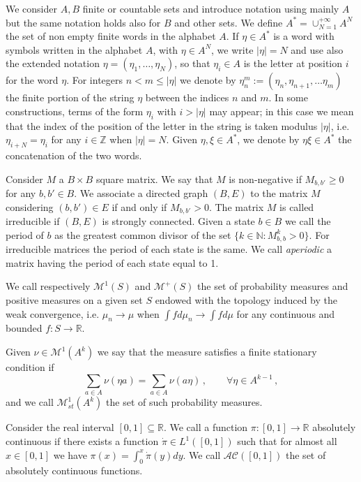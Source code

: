 \documentclass[reqno]{amsart}
\theoremstyle{plain}
\theoremstyle{definition}
\theoremstyle{remark}
\numberwithin{equation}{section}
\numberwithin{theorem}{section}
\newcommand{\<}{\langle}
\renewcommand{\>}{\rangle}
\begin{document}
	We consider $A,B$ finite or countable sets and introduce notation using mainly $A$ but the same notation holds also for $B$ and other sets. We define $A^*=\cup_{N=1}^{+\infty}A^N$ the set of non empty finite words in the alphabet $A$.
	If $\eta\in A^*$ is a word with symbols written in the alphabet $A$, with $\eta\in A^N$, we write $|\eta|=N$ and use also the extended notation $\eta=(\eta_1,\dots ,\eta_N)$, so that $\eta_i\in A$ is the letter at position $i$ for the word $\eta$. For integers $n<m\leq |\eta|$ we denote by $\eta_n^m:=(\eta_n,\eta_{n+1},\dots \eta_m)$ the finite portion of the string $\eta$ between the indices $n$ and $m$. In some constructions, terms of the form $\eta_i$ with $i>|\eta|$ may appear; in this case we mean that the index of the position of the letter in the string is taken modulus $|\eta|$, i.e. $\eta_{i+N}=\eta_i$ for any $i\in \mathbb Z$ when $|\eta|=N$. Given $\eta,\xi\in A^*$, we denote by $\eta\xi\in A^*$ the concatenation of the two words. 
	\smallskip
	
	
	Consider $M$ a $B \times B$ square matrix. We say that $M$ is non-negative if $M_{b,b'}\geq 0$ for any $b,b'\in B$.
	We associate a directed graph $(B,E)$ to the matrix $M$ considering $(b,b')\in E$ if and only if $M_{b,b'}>0$.
	The matrix $M$ is called irreducible if $(B,E)$ is strongly connected. Given a state $b\in B$ we call the period of $b$ as the greatest common divisor of the set $\{k\in \mathbb N : M^k_{b,b}>0\}$. For irreducible matrices the period of each state is the same. We call {\it aperiodic} a matrix having the period of each state equal to 1.
	
	\smallskip
	
	We call respectively $\mathcal M^1(S)$ and $\mathcal M^+(S)$ the set of probability measures and positive measures on a given set $S$ endowed with the topology induced by the weak convergence, i.e. $\mu_n\to\mu$ when $\int fd\mu_n\to \int fd\mu$ for any continuous and bounded $f:S\to \mathbb R$. 
	
	Given $\nu\in \mathcal M^1(A^k)$ we say that the measure satisfies a finite stationary condition if
	\begin{equation}\label{staz-fin}
		\sum_{a\in A}\nu(\eta a)=\sum_{a\in A}\nu (a\eta )\,,\qquad \forall \eta\in A^{k-1}\,,
	\end{equation}
	and we call $\mathcal M^1_{st}(A^k)$ the set of such probability measures. 
	
	\smallskip
	
	
	Consider the real interval $[0,1]\subseteq \mathbb R$.
	We call a function $\pi:[0,1]\to \mathbb R$ absolutely continuous if there exists a function $\dot\pi\in L^1([0,1])$
	such that for almost all $x\in[0,1]$ we have $\pi(x)=\int_0^x\dot\pi(y)dy$. We call $\mathcal{AC}([0,1])$ the set of absolutely continuous functions. 
	
\end{document}
